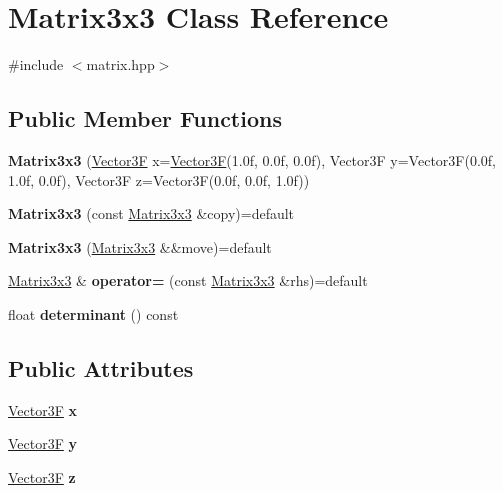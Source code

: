 \hypertarget{class_matrix3x3}{}\section{Matrix3x3 Class Reference}
\label{class_matrix3x3}


{\ttfamily \#include $<$matrix.\+hpp$>$}

\subsection*{Public Member Functions}
\begin{DoxyCompactItemize}
\item 
\mbox{\label{class_matrix3x3_a126c8cf7100a18e5f3c4bd0054bb2b00}} 
{\bfseries Matrix3x3} (\mbox{\hyperlink{class_vector3}{Vector3F}} x=\mbox{\hyperlink{class_vector3}{Vector3F}}(1.\+0f, 0.\+0f, 0.\+0f), Vector3\+F y=\+Vector3\+F(0.\+0f, 1.\+0f, 0.\+0f), Vector3\+F z=\+Vector3\+F(0.\+0f, 0.\+0f, 1.\+0f))
\item 
\mbox{\label{class_matrix3x3_ae89435375c03646f7a15778946a789e0}} 
{\bfseries Matrix3x3} (const \mbox{\hyperlink{class_matrix3x3}{Matrix3x3}} \&copy)=default
\item 
\mbox{\label{class_matrix3x3_a5235301dcaca04364c4a719232dc6402}} 
{\bfseries Matrix3x3} (\mbox{\hyperlink{class_matrix3x3}{Matrix3x3}} \&\&move)=default
\item 
\mbox{\label{class_matrix3x3_a6967e8fec0711f558ef729c115d481c3}} 
\mbox{\hyperlink{class_matrix3x3}{Matrix3x3}} \& {\bfseries operator=} (const \mbox{\hyperlink{class_matrix3x3}{Matrix3x3}} \&rhs)=default
\item 
\mbox{\label{class_matrix3x3_a3b5be8807294a84c16fa51038831008b}} 
float {\bfseries determinant} () const
\end{DoxyCompactItemize}
\subsection*{Public Attributes}
\begin{DoxyCompactItemize}
\item 
\mbox{\label{class_matrix3x3_a53e4d84cc55eb6a7639ec32564c841c5}} 
\mbox{\hyperlink{class_vector3}{Vector3F}} {\bfseries x}
\item 
\mbox{\label{class_matrix3x3_a53c81358a3b44ef3498ea2f1177dc8d2}} 
\mbox{\hyperlink{class_vector3}{Vector3F}} {\bfseries y}
\item 
\mbox{\label{class_matrix3x3_a7f7fd0abf00804b643845f0e364b93c8}} 
\mbox{\hyperlink{class_vector3}{Vector3F}} {\bfseries z}
\end{DoxyCompactItemize}


